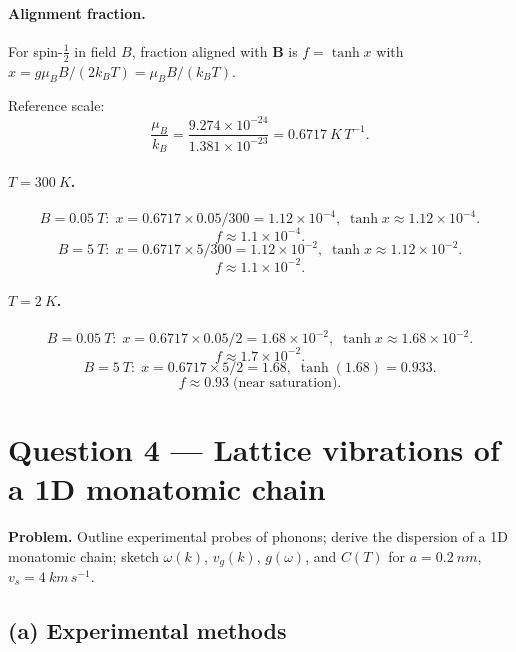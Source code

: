 \documentclass[11pt]{article}
\begin{document}
\paragraph{Alignment fraction.}
For spin-$\tfrac12$ in field $B$, fraction aligned with $\bm B$ is $f = \tanh x$ with $x = g\mu_B B/(2 k_B T) = \mu_B B/(k_B T)$.

Reference scale:
\[
\frac{\mu_B}{k_B} = \frac{9.274\times 10^{-24}}{1.381\times 10^{-23}} = \SI{0.6717}{K\,T^{-1}}.
\]

\paragraph{$T=\SI{300}{K}$.}
\[
B=\SI{0.05}{T}:\; x = 0.6717\times 0.05/300 = 1.12\times 10^{-4},\;\tanh x \approx 1.12\times 10^{-4}.
\]
\[
\boxed{\;f \approx 1.1\times 10^{-4}.\;}
\]
\[
B=\SI{5}{T}:\; x = 0.6717\times 5/300 = 1.12\times 10^{-2},\;\tanh x \approx 1.12\times 10^{-2}.
\]
\[
\boxed{\;f \approx 1.1\times 10^{-2}.\;}
\]

\paragraph{$T=\SI{2}{K}$.}
\[
B=\SI{0.05}{T}:\; x = 0.6717\times 0.05/2 = 1.68\times 10^{-2},\;\tanh x \approx 1.68\times 10^{-2}.
\]
\[
\boxed{\;f \approx 1.7\times 10^{-2}.\;}
\]
\[
B=\SI{5}{T}:\; x = 0.6717\times 5/2 = 1.68,\;\tanh(1.68) = 0.933.
\]
\[
\boxed{\;f \approx 0.93\;\text{(near saturation)}.\;}
\]

\section*{Question 4 --- Lattice vibrations of a 1D monatomic chain}

\textbf{Problem.} Outline experimental probes of phonons; derive the dispersion of a 1D monatomic chain; sketch $\omega(k)$, $v_g(k)$, $g(\omega)$, and $C(T)$ for $a=\SI{0.2}{nm}$, $v_s=\SI{4}{km\,s^{-1}}$.

\subsection*{(a) Experimental methods}
\end{document}
